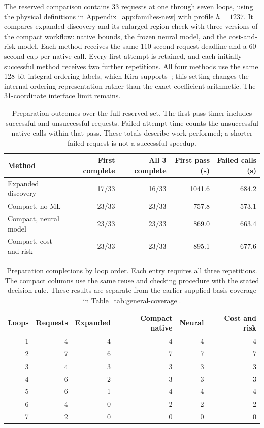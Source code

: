The reserved comparison contains 33 requests at one through seven loops, using the physical definitions in Appendix~\ref{app:families-new} with profile $h=1237$. It compares expanded discovery and its enlarged-region check with three versions of the compact workflow: native bounds, the frozen neural model, and the cost-and-risk model. Each method receives the same 110-second request deadline and a 60-second cap per native call. Every first attempt is retained, and each initially successful method receives two further repetitions. All four methods use the same 128-bit integral-ordering labels, which Kira supports~\cite{Kira3}; this setting changes the internal ordering representation rather than the exact coefficient arithmetic. The 31-coordinate interface limit remains.

\begin{table}[!htbp]\centering\small
\caption{Preparation outcomes over the full reserved set. The first-pass timer includes successful and unsuccessful requests. Failed-attempt time counts the unsuccessful native calls within that pass. These totals describe work performed; a shorter failed request is not a successful speedup.}
\label{tab:preparation-coverage}
\begin{tabularx}{\linewidth}{@{}Yrrrr@{}}\toprule
Method & First complete & All 3 complete & First pass (s) & Failed calls (s)\\\midrule
Expanded discovery & 17/33 & 16/33 & 1041.6 & 684.2\\
Compact, no ML & 23/33 & 23/33 & 757.8 & 573.1\\
Compact, neural model & 23/33 & 23/33 & 869.0 & 663.4\\
Compact, cost and risk & 23/33 & 23/33 & 895.1 & 677.6\\
\bottomrule\end{tabularx}\end{table}

\begin{table}[!htbp]\centering\small
\caption{Preparation completions by loop order. Each entry requires all three repetitions. The compact columns use the same reuse and checking procedure with the stated decision rule. These results are separate from the earlier supplied-basis coverage in Table~\ref{tab:general-coverage}.}
\label{tab:preparation-loops}
\begin{tabular}{@{}rrrrrr@{}}\toprule
Loops & Requests & Expanded & Compact native & Neural & Cost and risk\\\midrule
1 & 4 & 4 & 4 & 4 & 4\\
2 & 7 & 6 & 7 & 7 & 7\\
3 & 4 & 3 & 3 & 3 & 3\\
4 & 6 & 2 & 3 & 3 & 3\\
5 & 6 & 1 & 4 & 4 & 4\\
6 & 4 & 0 & 2 & 2 & 2\\
7 & 2 & 0 & 0 & 0 & 0\\
\bottomrule\end{tabular}\end{table}

